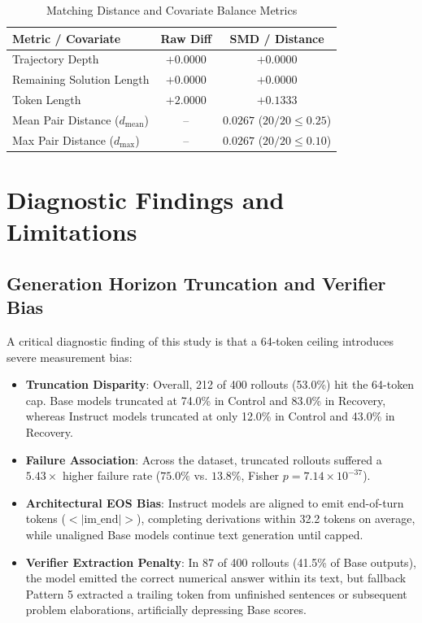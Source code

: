 \documentclass[conference]{IEEEtran}
\begin{document}
\begin{table}[htbp]
\caption{Matching Distance and Covariate Balance Metrics}
\label{tab:sensitivity}
\centering
\begin{tabularx}{\columnwidth}{Xcc}
\toprule
\textbf{Metric / Covariate} & \textbf{Raw Diff} & \textbf{SMD / Distance} \\
\midrule
Trajectory Depth & $+0.0000$ & $+0.0000$ \\
Remaining Solution Length & $+0.0000$ & $+0.0000$ \\
Token Length & $+2.0000$ & $+0.1333$ \\
\midrule
Mean Pair Distance ($d_{\text{mean}}$) & -- & $0.0267$ ($20/20 \le 0.25$) \\
Max Pair Distance ($d_{\max}$) & -- & $0.0267$ ($20/20 \le 0.10$) \\
\bottomrule
\end{tabularx}
\end{table}

\section{Diagnostic Findings and Limitations}

\subsection{Generation Horizon Truncation and Verifier Bias}
A critical diagnostic finding of this study is that a 64-token ceiling introduces severe measurement bias:
\begin{itemize}
    \item \textbf{Truncation Disparity}: Overall, 212 of 400 rollouts (53.0\%) hit the 64-token cap. Base models truncated at 74.0\% in Control and 83.0\% in Recovery, whereas Instruct models truncated at only 12.0\% in Control and 43.0\% in Recovery.
    \item \textbf{Failure Association}: Across the dataset, truncated rollouts suffered a $5.43\times$ higher failure rate ($75.0\%$ vs. $13.8\%$, Fisher $p = 7.14 \times 10^{-37}$).
    \item \textbf{Architectural EOS Bias}: Instruct models are aligned to emit end-of-turn tokens ($<|\text{im\_end}|>$), completing derivations within 32.2 tokens on average, while unaligned Base models continue text generation until capped.
    \item \textbf{Verifier Extraction Penalty}: In 87 of 400 rollouts (41.5\% of Base outputs), the model emitted the correct numerical answer within its text, but fallback Pattern 5 extracted a trailing token from unfinished sentences or subsequent problem elaborations, artificially depressing Base scores.
\end{itemize}
\end{document}
